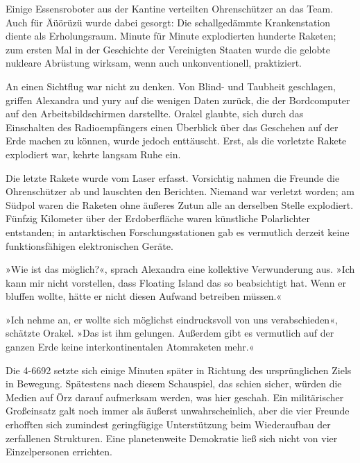 Einige Essensroboter aus der Kantine verteilten Ohrenschützer an das Team. Auch für Äüörüzü wurde dabei gesorgt: Die schallgedämmte Krankenstation diente als Erholungsraum. Minute für Minute explodierten hunderte Raketen; zum ersten Mal in der Geschichte der Vereinigten Staaten wurde die gelobte nukleare Abrüstung wirksam, wenn auch unkonventionell, praktiziert.

An einen Sichtflug war nicht zu denken. Von Blind- und Taubheit geschlagen, griffen Alexandra und yury auf die wenigen Daten zurück, die der Bordcomputer auf den Arbeitsbildschirmen darstellte. Orakel glaubte, sich durch das Einschalten des Radioempfängers einen Überblick über das Geschehen auf der Erde machen zu können, wurde jedoch enttäuscht. Erst, als die vorletzte Rakete explodiert war, kehrte langsam Ruhe ein.


Die letzte Rakete wurde vom Laser erfasst. Vorsichtig nahmen die Freunde die Ohrenschützer ab und lauschten den Berichten. Niemand war verletzt worden; am Südpol waren die Raketen ohne äußeres Zutun alle an derselben Stelle explodiert. Fünfzig Kilometer über der Erdoberfläche waren künstliche Polarlichter entstanden; in antarktischen Forschungsstationen gab es vermutlich derzeit keine funktionsfähigen elektronischen Geräte.

»Wie ist das möglich?«, sprach Alexandra eine kollektive Verwunderung aus. »Ich kann mir nicht vorstellen, dass Floating Island das so beabsichtigt hat. Wenn er bluffen wollte, hätte er nicht diesen Aufwand betreiben müssen.«

»Ich nehme an, er wollte sich möglichst eindrucksvoll von uns verabschieden«, schätzte Orakel. »Das ist ihm gelungen. Außerdem gibt es vermutlich auf der ganzen Erde keine interkontinentalen Atomraketen mehr.«

Die 4-6692 setzte sich einige Minuten später in Richtung des ursprünglichen Ziels in Bewegung. Spätestens nach diesem Schauspiel, das schien sicher, würden die Medien auf Örz darauf aufmerksam werden, was hier geschah. Ein militärischer Großeinsatz galt noch immer als äußerst unwahrscheinlich, aber die vier Freunde erhofften sich zumindest geringfügige Unterstützung beim Wiederaufbau der zerfallenen Strukturen. Eine planetenweite Demokratie ließ sich nicht von vier Einzelpersonen errichten.

